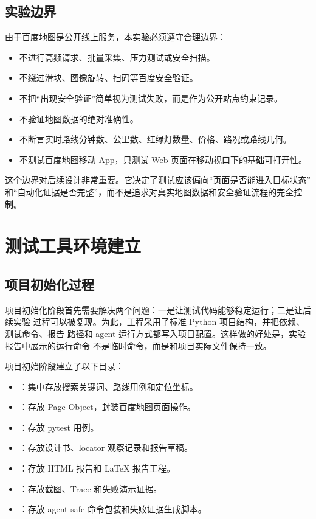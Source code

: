 \documentclass[UTF8,a4paper,12pt]{ctexart}
\begin{document}
\subsection{实验边界}

由于百度地图是公开线上服务，本实验必须遵守合理边界：

\begin{itemize}
  \item 不进行高频请求、批量采集、压力测试或安全扫描。
  \item 不绕过滑块、图像旋转、扫码等百度安全验证。
  \item 不把“出现安全验证”简单视为测试失败，而是作为公开站点约束记录。
  \item 不验证地图数据的绝对准确性。
  \item 不断言实时路线分钟数、公里数、红绿灯数量、价格、路况或路线几何。
  \item 不测试百度地图移动 App，只测试 Web 页面在移动视口下的基础可打开性。
\end{itemize}

这个边界对后续设计非常重要。它决定了测试应该偏向“页面是否能进入目标状态”
和“自动化证据是否完整”，而不是追求对真实地图数据和安全验证流程的完全控制。

\section{测试工具环境建立}

\subsection{项目初始化过程}

项目初始化阶段首先需要解决两个问题：一是让测试代码能够稳定运行；二是让后续实验
过程可以被复现。为此，工程采用了标准 Python 项目结构，并把依赖、测试命令、报告
路径和 agent 运行方式都写入项目配置。这样做的好处是，实验报告中展示的运行命令
不是临时命令，而是和项目实际文件保持一致。

项目初始阶段建立了以下目录：

\begin{itemize}
  \item {}：集中存放搜索关键词、路线用例和定位坐标。
  \item {}：存放 Page Object，封装百度地图页面操作。
  \item {}：存放 pytest 用例。
  \item {}：存放设计书、locator 观察记录和报告草稿。
  \item {}：存放 HTML 报告和 LaTeX 报告工程。
  \item {}：存放截图、Trace 和失败演示证据。
  \item {}：存放 agent-safe 命令包装和失败证据生成脚本。
\end{itemize}
\end{document}
